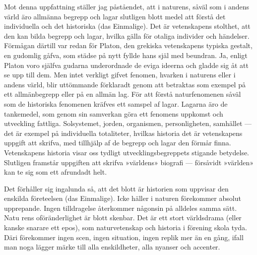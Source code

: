 \documentclass[12pt]{article}
\newcommand{\opage}[1]{\marginnote{\footnotesize\textit{[#1]}}}
\begin{document}
Mot denna uppfattning ställer jag påståendet, att i naturens, såväl som i andens värld äro allmänna begrepp och lagar slutligen blott medel att förstå det individuella och det historiska (das Einmalige). Det är vetenskapens stolthet, att den kan bilda begrepp och lagar, hvilka gälla för otaliga individer och händelser. Förmågan därtill var redan för Platon, den grekiska vetenskapens typiska gestalt, en gudomlig gåfva, som städse på nytt fyllde hans själ med beundran. Ja, %
\opage{21}
enligt Platon voro själfva gudarna underordnade de eviga ideerna och gladde sig åt att se upp till dem. Men intet verkligt gifvet fenomen, hvarken i naturens eller i andens värld, blir uttömmande förklaradt genom att betraktas som exempel på ett allmänbegrepp eller på en allmän lag. För att förstå naturfenomenen såväl som de historiska fenomenen kräfves ett samspel af lagar. Lagarna äro de tankemedel, som genom sin samverkan göra ett fenomens uppkomst och utveckling fattliga. Solsystemet, jorden, organismen, personligheten, samhället --- det är exempel på individuella totaliteter, hvilkas historia det är vetenskapens uppgift att skrifva, med tillhjälp af de begrepp och lagar den förmår finna. Vetenskapens historia visar oss tydligt utvecklingsbegreppets stigande betydelse. Slutligen framstår uppgiften att skrifva »världens» biografi --- försåvidt »världen» kan te sig som ett afrundadt helt.

Det förhåller sig ingalunda så, att det blott är historien som uppvisar den enskilda företeelsen (das Einmalige). Icke häller i naturen förekommer absolut upprepande. Ingen tilldragelse återkommer någonsin på alldeles samma sätt. Natu%
\opage{22}
rens oföränderlighet är blott skenbar. Det är ett stort världsdrama (eller kanske snarare ett epos), som naturvetenskap och historia i förening skola tyda. Däri förekommer ingen scen, ingen situation, ingen replik mer än en gång, ifall man noga lägger märke till alla enskildheter, alla nyanser och accenter.
\end{document}
